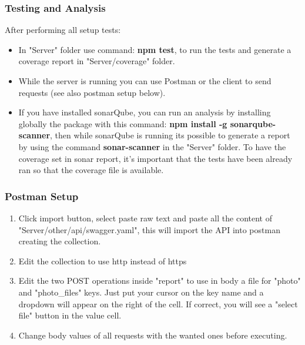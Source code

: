 \subsubsection{Testing and Analysis}
After performing all setup tests:
\begin{itemize}
	\item In "Server" folder use command: \textbf{npm test}, to run the tests and generate a coverage report in "Server/coverage" folder.
	\item While the server is running you can use Postman or the client to send requests (see also postman setup below).
	\item If you have installed sonarQube, you can run an analysis by installing globally the package with this command: \textbf{npm install -g sonarqube-scanner}, then while sonarQube is running its possible to generate a report by using the command \textbf{sonar-scanner} in the "Server" folder. To have the coverage set in sonar report, it's important that the tests have been already ran so that the coverage file is available.
\end{itemize}

\subsubsection{Postman Setup}
\begin{enumerate}
	\item Click import button, select paste raw text and paste all the content of "Server/other/api/swagger.yaml", this will import the API into postman creating the collection.
	\item Edit the collection to use http instead of https
	\item Edit the two POST operations inside "report" to use in body a file for "photo" and "photo\_files" keys. Just put your cursor on the key name and a dropdown will appear on the right of the cell. If correct, you will see a "select file" button in the value cell.
	\item Change body values of all requests with the wanted ones before executing.
\end{enumerate}